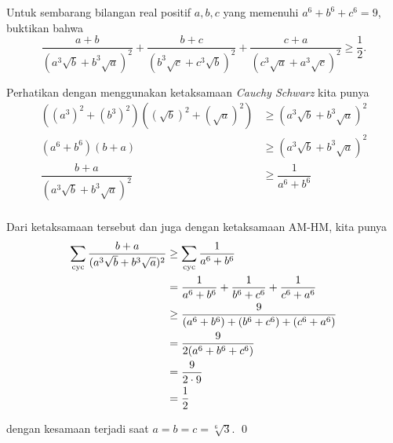 \documentclass[11pt]{scrartcl}
\begin{document}
	
	\begin{soalbaru} Untuk sembarang bilangan real positif $a,b,c$ yang memenuhi $a^6+b^6+c^6=9$, buktikan bahwa $$\dfrac{a+b}{(a^3\sqrt{b}+b^3\sqrt{a})^2}+\dfrac{b+c}{(b^3\sqrt{c}+c^3\sqrt{b})^2}+\dfrac{c+a}{(c^3\sqrt{a}+a^3\sqrt{c})^2} \ge \dfrac{1}{2}.$$
	
	\begin{solusi}
	Perhatikan dengan menggunakan ketaksamaan \textit{Cauchy Schwarz} kita punya
	\begin{equation*}
	\begin{split}
	((a^3)^2+(b^3)^2)((\sqrt{b})^2+(\sqrt{a})^2) &\ge (a^3\sqrt{b}+b^3\sqrt{a})^2\\
	(a^6+b^6)(b+a) &\ge (a^3\sqrt{b}+b^3\sqrt{a})^2\\
	\dfrac{b+a}{(a^3\sqrt{b}+b^3\sqrt{a})^2} &\ge \dfrac{1}{a^6+b^6}\\
	\end{split}
	\end{equation*}
	
	Dari ketaksamaan tersebut dan juga dengan ketaksamaan AM-HM, kita punya
	\begin{equation*}
	\begin{split}
	\sum_{\mathrm{cyc}} \dfrac{b+a}{(a^3\sqrt{b}+b^3\sqrt{a})^2} &\ge \sum_{\mathrm{cyc}} \dfrac{1}{a^6+b^6}\\ &= \dfrac{1}{a^6+b^6}+\dfrac{1}{b^6+c^6}+\dfrac{1}{c^6+a^6}\\
	&\ge \dfrac{9}{(a^6+b^6)+(b^6+c^6)+(c^6+a^6)}\\
	&= \dfrac{9}{2(a^6+b^6+c^6)}\\
	&= \dfrac{9}{2\cdot 9}\\
	&= \dfrac{1}{2}
	\end{split}
	\end{equation*}
	
	dengan kesamaan terjadi saat $a=b=c=\sqrt[6]{3}$. \qed
	\end{solusi}
		\end{soalbaru}
	
\end{document}
